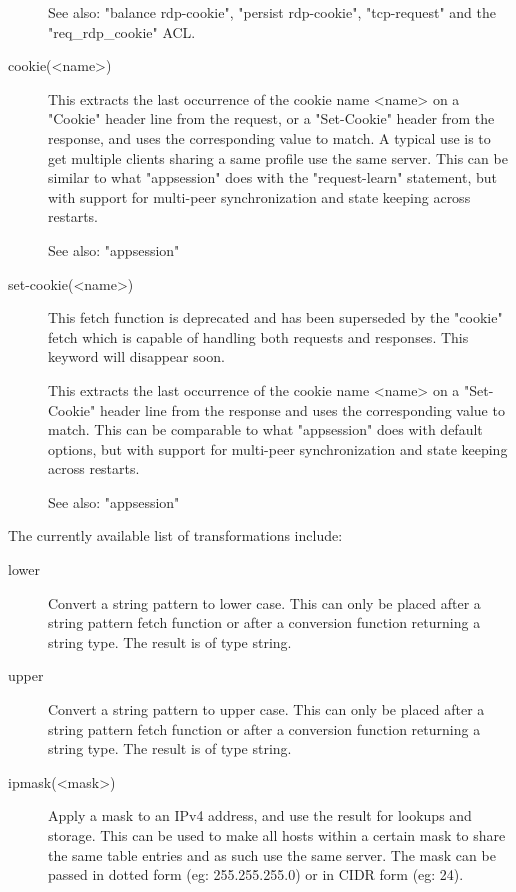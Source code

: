 \begin{description}
               See also: "balance rdp-cookie", "persist rdp-cookie",
               "tcp-request" and the "req\_rdp\_cookie" ACL.

\item[cookie(<name>)]
               This extracts the last occurrence of the cookie name <name> on a
               "Cookie" header line from the request, or a "Set-Cookie" header
               from the response, and uses the corresponding value to match. A
               typical use is to get multiple clients sharing a same profile
               use the same server. This can be similar to what "appsession"
               does with the "request-learn" statement, but with support for
               multi-peer synchronization and state keeping across restarts.

               See also: "appsession"

\item[set-cookie(<name>)]
               This fetch function is deprecated and has been superseded by the
               "cookie" fetch which is capable of handling both requests and
               responses. This keyword will disappear soon.

               This extracts the last occurrence of the cookie name <name> on a
               "Set-Cookie" header line from the response and uses the
               corresponding value to match. This can be comparable to what
               "appsession" does with default options, but with support for
                multi-peer synchronization and state keeping across restarts.
                
                See also: "appsession"
\end{description}

The currently available list of transformations include:

\begin{description}
\item[lower]
               Convert a string pattern to lower case. This can only be placed
               after a string pattern fetch function or after a conversion
               function returning a string type. The result is of type string.

\item[upper]
               Convert a string pattern to upper case. This can only be placed
               after a string pattern fetch function or after a conversion
               function returning a string type. The result is of type string.

\item[ipmask(<mask>)]
               Apply a mask to an IPv4 address, and use the result for lookups
               and storage. This can be used to make all hosts within a
               certain mask to share the same table entries and as such use
               the same server. The mask can be passed in dotted form (eg:
               255.255.255.0) or in CIDR form (eg: 24).
\end{description}
